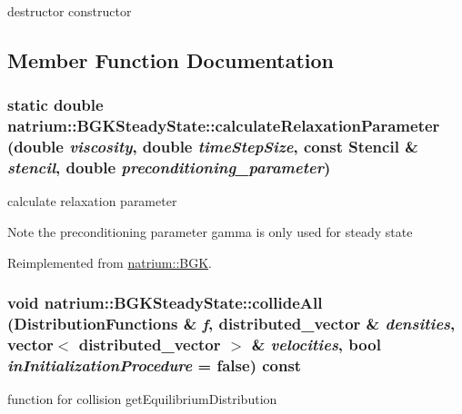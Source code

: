 destructor constructor 

\subsection{Member Function Documentation}
\hypertarget{classnatrium_1_1BGKSteadyState_a2cd6628c71475663e204656147de99b8}{
\subsubsection[{calculateRelaxationParameter}]{\setlength{\rightskip}{0pt plus 5cm}static double natrium::BGKSteadyState::calculateRelaxationParameter (double {\em viscosity}, \/  double {\em timeStepSize}, \/  const {\bf Stencil} \& {\em stencil}, \/  double {\em preconditioning\_\-parameter})}}
\label{classnatrium_1_1BGKSteadyState_a2cd6628c71475663e204656147de99b8}


calculate relaxation parameter \begin{DoxyNote}{Note}
the preconditioning parameter gamma is only used for steady state 
\end{DoxyNote}


Reimplemented from \hyperlink{classnatrium_1_1BGK_a430f5020b6101a64d89a0cc2a246260e}{natrium::BGK}.\hypertarget{classnatrium_1_1BGKSteadyState_a21eda1096ed5c75672b338a75f49d2cc}{
\subsubsection[{collideAll}]{\setlength{\rightskip}{0pt plus 5cm}void natrium::BGKSteadyState::collideAll ({\bf DistributionFunctions} \& {\em f}, \/  distributed\_\-vector \& {\em densities}, \/  vector$<$ distributed\_\-vector $>$ \& {\em velocities}, \/  bool {\em inInitializationProcedure} = {\ttfamily false}) const}}
\label{classnatrium_1_1BGKSteadyState_a21eda1096ed5c75672b338a75f49d2cc}


function for collision getEquilibriumDistribution

